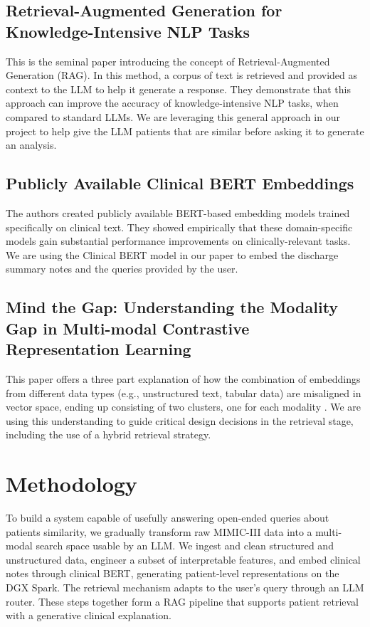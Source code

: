 \documentclass[acmtog]{acmart}
\begin{document}
\subsection{Retrieval-Augmented Generation for Knowledge-Intensive NLP Tasks}

This is the seminal paper introducing the concept of Retrieval-Augmented Generation (RAG). In this method, a corpus of text is retrieved and provided as context to the LLM to help it generate a response. They demonstrate that this approach can improve the accuracy of knowledge-intensive NLP tasks, when compared to standard LLMs. \cite{lewis2020rag} We are leveraging this general approach in our project to help give the LLM patients that are similar before asking it to generate an analysis.

\subsection{Publicly Available Clinical BERT Embeddings}
The authors created publicly available BERT-based embedding models trained specifically on clinical text. They showed empirically that these domain-specific models gain substantial performance improvements on clinically-relevant tasks. We are using the Clinical BERT model \cite{alsentzer2019clinicalbert} in our paper to embed the discharge summary notes and the queries provided by the user.

\subsection{Mind the Gap: Understanding the Modality Gap in Multi-modal Contrastive Representation Learning}
This paper offers a three part explanation of how the combination of embeddings from different data types (e.g., unstructured text, tabular data) are misaligned in vector space, ending up consisting of two clusters, one for each modality \cite{liang2022modalitygap}. We are using this understanding to guide critical design decisions in the retrieval stage, including the use of a hybrid retrieval strategy.

\section{Methodology}
To build a system capable of usefully answering open-ended queries about patients similarity, we gradually transform raw MIMIC-III data into a multi-modal search space usable by an LLM. We ingest and clean structured and unstructured data, engineer a subset of interpretable features, and embed clinical notes through clinical BERT, generating patient-level representations on the DGX Spark. The retrieval mechanism adapts to the user{’}s query through an LLM router. These steps together form a RAG pipeline that supports patient retrieval with a generative clinical explanation.
\end{document}
